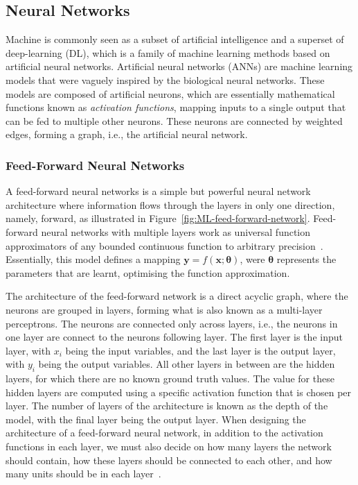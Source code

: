 \subsection{Neural Networks}

Machine is commonly seen as a subset of artificial intelligence and a superset of deep-learning (DL), which is a family of machine learning methods based on artificial neural networks.
Artificial neural networks (ANNs) are machine learning models that were vaguely inspired by the biological neural networks.
These models are composed of artificial neurons, which are essentially mathematical functions known as \textit{activation functions}, mapping inputs to a single output that can be fed to multiple other neurons.
These neurons are connected by weighted edges, forming a graph, i.e., the artificial neural network.

\subsubsection{Feed-Forward Neural Networks}

A feed-forward neural networks is a simple but powerful neural network architecture where information flows through the layers in only one direction, namely, forward, as illustrated in Figure~\ref{fig:ML-feed-forward-network}.
Feed-forward neural networks with multiple layers work as universal function approximators of any bounded continuous function to arbitrary precision~\cite{hornik91,lu17}.
Essentially, this model defines a mapping $\mathbf{y} = f(\mathbf{x};\mathbf{\theta})$, were $\mathbf{\theta}$ represents the parameters that are learnt, optimising the function approximation.

The architecture of the feed-forward network is a direct acyclic graph, where the neurons are grouped in layers, forming what is also known as a multi-layer perceptrons.
The neurons are connected only across layers, i.e., the neurons in one layer are connect to the neurons following layer.
The first layer is the input layer, with $x_i$ being the input variables, and the last layer is the output layer, with $y_i$ being the output variables.
All other layers in between are the hidden layers, for which there are no known ground truth values.
The value for these hidden layers are computed using a specific activation function that is chosen per layer.
The number of layers of the architecture is known as the depth of the model, with the final layer being the output layer.
When designing the architecture of a feed-forward neural network, in addition to the activation functions in each layer, we must also decide on how many layers the network should contain, how these layers should be connected to each other, and how many units should be in each layer~\cite{goodfellow16}.

